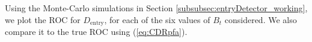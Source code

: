 \documentclass[11pt]{article}
\begin{document}
Using the Monte-Carlo simulations in Section \ref{subsubsec:entryDetector_working}, we plot the ROC for $D_{\text{entry}}$, for each of the six values of $B_{t}$ considered. We also compare it to the true ROC using (\ref{eq:CDRpfa}).
\begin{figure}[h!]
\centering
{}

\end{figure}
\end{document}
